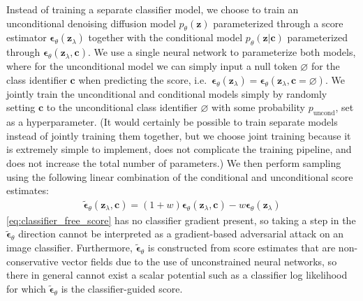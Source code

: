\documentclass{article} %
\newcommand{\bc}{\mathbf{c}}
\newcommand{\bz}{\mathbf{z}}
\newcommand{\bepsilon}{{\boldsymbol{\epsilon}}}
\begin{document}
Instead of training a separate classifier model, we choose to train an unconditional denoising diffusion model $p_{\theta}(\bz)$ parameterized through a score estimator $\bepsilon_{\theta}(\bz_\lambda)$ together with the conditional model $p_{\theta}(\bz | \bc)$ parameterized through $\bepsilon_{\theta}(\bz_\lambda, \bc)$. We use a single neural network to parameterize both models, where for the unconditional model we can simply input a null token $\varnothing$ for the class identifier $\bc$ when predicting the score, i.e.\ $\bepsilon_{\theta}(\bz_\lambda) = \bepsilon_{\theta}(\bz_\lambda, \bc = \varnothing)$. We jointly train the unconditional and conditional models simply by randomly setting $\bc$ to the unconditional class identifier $\varnothing$ with some probability $p_\mathrm{uncond}$, set as a hyperparameter. (It would certainly be possible to train separate models instead of jointly training them together, but we  choose joint training because it is extremely simple to implement, does not complicate the training pipeline, and does not increase the total number of parameters.)
We then perform sampling using the following linear combination of the conditional and unconditional score estimates:
\begin{align}
    \tilde{\bepsilon}_\theta(\bz_\lambda, \bc) = (1+w)\bepsilon_\theta(\bz_\lambda, \bc) - w\bepsilon_{\theta}(\bz_\lambda) \label{eq:classifier_free_score}
\end{align}
\cref{eq:classifier_free_score} has no classifier gradient present, so taking a step in the $\tilde\bepsilon_\theta$ direction cannot be interpreted as a gradient-based adversarial attack on an image classifier. Furthermore, $\tilde\bepsilon_\theta$ is constructed from score estimates that are non-conservative vector fields due to the use of unconstrained neural networks, so there in general cannot exist a scalar potential such as a classifier log likelihood for which $\tilde\bepsilon_\theta$ is the classifier-guided score. 
\end{document}
